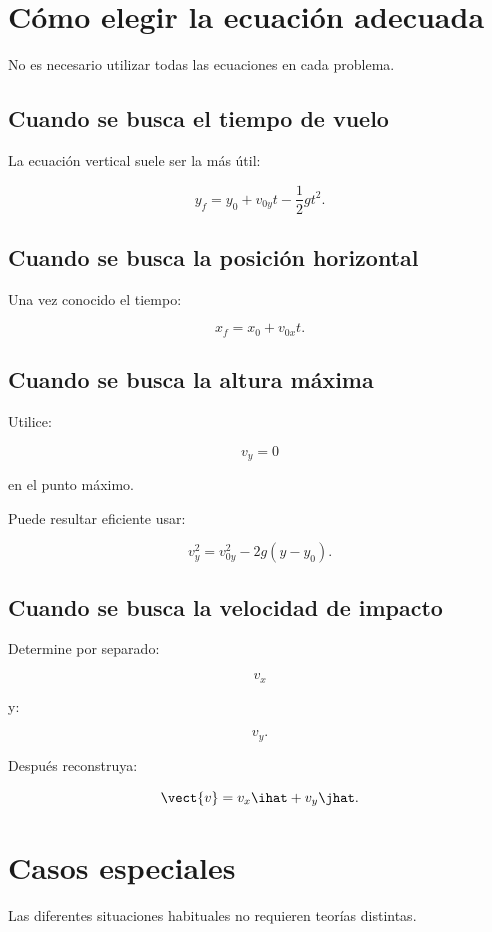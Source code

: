 \section{Cómo elegir la ecuación adecuada}

No es necesario utilizar todas las ecuaciones en cada problema.

\subsection{Cuando se busca el tiempo de vuelo}

La ecuación vertical suele ser la más útil:

\[
y_f
=
y_0
+
v_{0y}t
-
\frac{1}{2}gt^2.
\]


\subsection{Cuando se busca la posición horizontal}

Una vez conocido el tiempo:

\[
x_f
=
x_0+v_{0x}t.
\]


\subsection{Cuando se busca la altura máxima}

Utilice:

\[
v_y=0
\]

en el punto máximo.

Puede resultar eficiente usar:

\[
v_y^2
=
v_{0y}^2
-
2g(y-y_0).
\]


\subsection{Cuando se busca la velocidad de impacto}

Determine por separado:

\[
v_x
\]

y:

\[
v_y.
\]

Después reconstruya:

\[
\vect{v}
=
v_x\ihat+v_y\jhat.
\]


\section{Casos especiales}

Las diferentes situaciones habituales no requieren teorías distintas.

